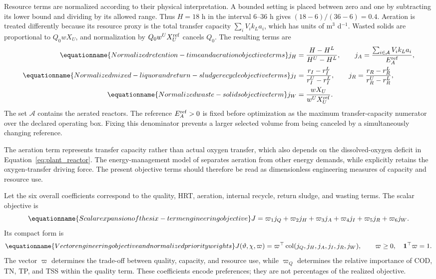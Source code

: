 Resource terms are normalized according to their physical interpretation. A bounded setting is placed between zero and one by subtracting its lower bound and dividing by its allowed range. Thus $H=18$ h in the interval 6--36 h gives $(18-6)/(36-6)=0.4$. Aeration is treated differently because its resource proxy is the total transfer capacity $\sum_iV_i k_La_i$, which has units of m$^3$ d$^{-1}$. Wasted solids are proportional to $Q_0wX_U$, and normalization by $Q_0w^UX_U^{\rm ref}$ cancels $Q_0$. The resulting terms are
\begin{align}
\equationname{Normalized retention-time and aeration objective terms}
j_H&=\frac{H-H^L}{H^U-H^L},\qquad
j_A=\frac{\sum_{i\in\mathcal A}V_i k_La_i}{E_A^{\rm ref}},\\
\equationname{Normalized mixed-liquor and return-sludge recycle objective terms}
j_I&=\frac{r_I-r_I^L}{r_I^U-r_I^L},\qquad
j_R=\frac{r_R-r_R^L}{r_R^U-r_R^L},\\
\equationname{Normalized waste-solids objective term}
j_W&=\frac{wX_U}{w^UX_U^{\rm ref}}.
\label{eq:plant_resource_objective}
\end{align}
The set $\mathcal A$ contains the aerated reactors. The reference $E_A^{\rm ref}>0$ is fixed before optimization as the maximum transfer-capacity numerator over the declared operating box. Fixing this denominator prevents a larger selected volume from being canceled by a simultaneously changing reference.

The aeration term represents transfer capacity rather than actual oxygen transfer, which also depends on the dissolved-oxygen deficit in Equation~\eqref{eq:plant_reactor}. The energy-management model of \citet{Miederer2025} separates aeration from other energy demands, while \citet{Zhang2026} explicitly retains the oxygen-transfer driving force. The present objective terms should therefore be read as dimensionless engineering measures of capacity and resource use.

Let the six overall coefficients correspond to the quality, HRT, aeration, internal recycle, return sludge, and wasting terms. The scalar objective is
\begin{equation}
\equationname{Scalar expansion of the six-term engineering objective}
J=\varpi_1j_Q+\varpi_2j_H+\varpi_3j_A+\varpi_4j_I+\varpi_5j_R+\varpi_6j_W.
\end{equation}
Its compact form is
\begin{equation}
\equationname{Vector engineering objective and normalized priority weights}
J(\vartheta,\chi,\varpi)=\varpi^\top
\operatorname{col}(j_Q,j_H,j_A,j_I,j_R,j_W),\qquad
\varpi\ge0,\quad\mathbf1^\top\varpi=1.
\label{eq:plant_engineering_objective}
\end{equation}
The vector $\varpi$ determines the trade-off between quality, capacity, and resource use, while $\varpi_Q$ determines the relative importance of COD, TN, TP, and TSS within the quality term. These coefficients encode preferences; they are not percentages of the realized objective.

